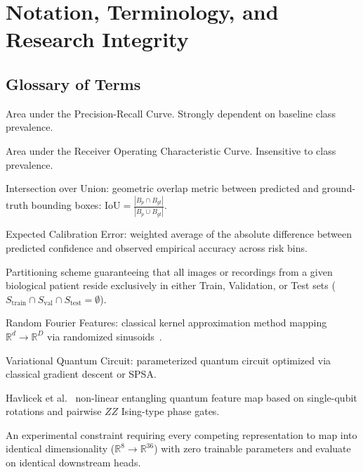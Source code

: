 \documentclass[11pt,a4paper]{report}
\begin{document}
\chapter*{Notation, Terminology, and Research Integrity}

\section*{Glossary of Terms}
\begin{description}[leftmargin=3.5cm,style=nextline]
  \item[PR-AUC] Area under the Precision-Recall Curve. Strongly dependent on baseline class prevalence.
  \item[ROC-AUC] Area under the Receiver Operating Characteristic Curve. Insensitive to class prevalence.
  \item[IoU] Intersection over Union: geometric overlap metric between predicted and ground-truth bounding boxes: $\text{IoU} = \frac{|B_p \cap B_{gt}|}{|B_p \cup B_{gt}|}$.
  \item[ECE] Expected Calibration Error: weighted average of the absolute difference between predicted confidence and observed empirical accuracy across risk bins.
  \item[Patient-Disjoint] Partitioning scheme guaranteeing that all images or recordings from a given biological patient reside exclusively in either Train, Validation, or Test sets ($S_\text{train} \cap S_\text{val} \cap S_\text{test} = \emptyset$).
  \item[RFF] Random Fourier Features: classical kernel approximation method mapping $\mathbb{R}^d \to \mathbb{R}^D$ via randomized sinusoids~\cite{rahimi2007random}.
  \item[VQC] Variational Quantum Circuit: parameterized quantum circuit optimized via classical gradient descent or SPSA.
  \item[ZZ Feature Map] Havlicek et al.~\cite{havlicek2019supervised} non-linear entangling quantum feature map based on single-qubit rotations and pairwise $ZZ$ Ising-type phase gates.
  \item[Same-Shape Contract] An experimental constraint requiring every competing representation to map into identical dimensionality ($\mathbb{R}^8 \to \mathbb{R}^{36}$) with zero trainable parameters and evaluate on identical downstream heads.
\end{description}
\end{document}
